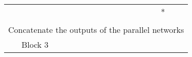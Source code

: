 \documentclass[journal]{IEEEtran}
\begin{document}
\begin{table*}
\begin{tabular}{c|c|c|c|c|c|c|c|c|}
\multicolumn{1}{|c|}{}                         & \multirow{2}{*}{} &                                                                              &                &                                                                              &               &                                                                             & * &                                                                             \\ \cline{4-4} \cline{6-6} \cline{8-8}
\multicolumn{1}{|c|}{}                         &                   &                                                                              &                        &                                                                              &                       &                                                                             &    &                                                                             \\ \hline
\multicolumn{9}{|c|}{Concatenate the outputs of the parallel networks}                                                                                                                                                                                                                                                                                                                                                                                                 \\ \hline
\multicolumn{1}{|c|}{\multirow{3}{*}{Block 3}} & \multicolumn{2}{c|}{}                                                                    & \multicolumn{2}{c|}{}                                                                         & \multicolumn{2}{c|}{}                                                                       & \multicolumn{2}{c|}{}                                                                        \\ \cline{2-9} 
\multicolumn{1}{|c|}{}                         & \multicolumn{2}{c|}{}                                                                    & \multicolumn{2}{c|}{}                                                                         & \multicolumn{2}{c|}{}                                                                       & \multicolumn{2}{c|}{}                                                                          \\ \cline{2-9} 
\multicolumn{1}{|c|}{}                         & \multicolumn{2}{c|}{}                                                                      & \multicolumn{2}{c|}{}                                                                           & \multicolumn{2}{c|}{}                                                                         & \multicolumn{2}{c|}{}                                                                                \\ \hline

\end{tabular}
\end{table*}
\end{document}
